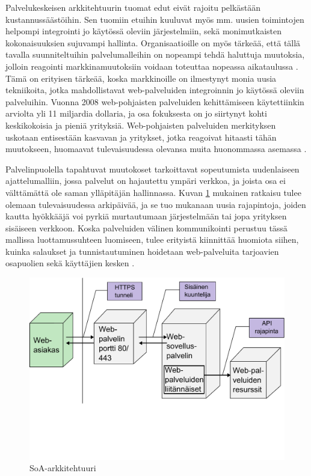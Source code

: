 Palvelukeskeisen arkkitehtuurin tuomat edut eivät rajoitu pelkästään
kustannussäästöihin. Sen tuomiin etuihin kuuluvat myös mm. uusien toimintojen
helpompi integrointi jo käytössä oleviin järjestelmiin, sekä monimutkaisten
kokonaisuuksien sujuvampi hallinta. Organisaatioille on myös tärkeää, että tällä
tavalla suunniteltuihin palvelumalleihin on nopeampi tehdä haluttuja muutoksia, jolloin 
reagointi markkinamuutoksiin voidaan toteuttaa nopeassa aikataulussa \cite{WEB2c}. Tämä on
erityisen tärkeää, koska markkinoille on ilmestynyt monia uusia tekniikoita,
jotka mahdollistavat web-palveluiden integroinnin jo käytössä oleviin
palveluihin. Vuonna 2008 web-pohjaisten palveluiden kehittämiseen
käytettiinkin arviolta yli 11 miljardia dollaria, ja osa fokuksesta on jo siirtynyt
kohti keskikokoisia ja pieniä yrityksiä. Web-pohjaisten palveluiden merkityksen
uskotaan entisestään kasvavan ja yritykset, jotka reagoivat hitaasti tähän
muutokseen, huomaavat tulevaisuudessa olevansa muita huonommassa asemassa \cite{WEB2b}.

Palvelinpuolella tapahtuvat muutokoset tarkoittavat sopeutumista uudenlaiseen
ajattelumalliin, jossa palvelut on hajautettu ympäri verkkoa, ja joista osa ei
välttämättä ole saman ylläpitäjän hallinnassa. Kuvan \ref{soa} mukainen ratkaisu
tulee olemaan tulevaisuudessa arkipäivää, ja se tuo mukanaan uusia rajapintoja,
joiden kautta hyökkääjä voi pyrkiä murtautumaan järjestelmään tai jopa
yrityksen sisäiseen verkkoon. Koska palveluiden välinen kommunikointi perustuu
tässä mallissa luottamussuhteen luomiseen, tulee erityistä kiinnittää huomiota
siihen, kuinka salaukset ja tunnistautuminen hoidetaan web-palveluita tarjoavien
osapuolien sekä käyttäjien kesken \cite{WEB2b}.

\begin{figure}[htp]
\centering
\includegraphics[width=12cm]{pics/soa_arkkitehtuuri.pdf}
\caption{SoA-arkkitehtuuri}
\label{soa}
\end{figure}

